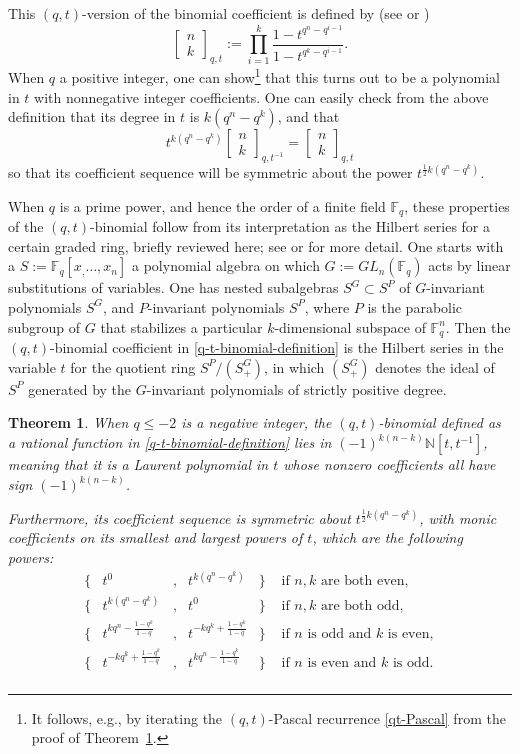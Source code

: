 \documentclass[10pt]{amsart}
\theoremstyle{plain}
\newtheorem{theorem}{Theorem}
\theoremstyle{definition}
\theoremstyle{remark}
\numberwithin{equation}{section}
\newcommand\qbin[3]{\left[\begin{matrix} #1 \\ #2 \end{matrix} \right]_{#3}}
\newcommand\FF{\mathbb{F}}
\newcommand\NN{\mathbb{N}}
\begin{document}
This $(q,t)$-version of the binomial coefficient
is defined by (see  \cite{RS} or \cite[p. 43]{RSW})
\begin{equation}
\label{q-t-binomial-definition}
\qbin{n}{k}{q,t}:=\prod_{i=1}^k \frac{1-t^{q^n-q^{i-1}}}
{1-t^{q^k-q^{i-1}}}.
\end{equation}
When $q$ a positive integer, one can show\footnote{It follows, 
e.g., by iterating the $(q,t)$-Pascal recurrence 
\eqref{qt-Pascal} from the proof of Theorem~\ref{lastthm}.}
that this turns out to be a polynomial in $t$ with 
nonnegative integer coefficients.
One can easily check from the above definition that 
its degree in $t$ is $k(q^n-q^k)$, and that
\begin{equation}
\label{coefficient-symmetry}
t^{k(q^n-q^k)} \qbin{n}{k}{q,t^{-1}}
=
 \qbin{n}{k}{q,t}
\end{equation}
so that its coefficient sequence will be symmetric about the power
$t^{\frac{1}{2} k(q^n-q^k)}$.

When $q$ is a prime power, and hence the order of a finite
field $\FF_q$, these properties of the
$(q,t)$-binomial follow from its interpretation
as the Hilbert series for a certain graded ring, 
briefly reviewed here; see \cite[\S 9]{RSW} or \cite{RS}
for more detail. One starts with a 
$S:=\FF_q[x_,\ldots,x_n]$ a polynomial algebra
on which $G:=GL_n(\FF_q)$ acts by linear substitutions of variables.
One has nested subalgebras $S^G \subset S^P$ of 
$G$-invariant polynomials $S^G$, and $P$-invariant polynomials $S^P$, where
$P$ is the parabolic subgroup of $G$ that stabilizes a particular $k$-dimensional
subspace of $\FF_q^n$.  Then the $(q,t)$-binomial coefficient in \eqref{q-t-binomial-definition}
is the Hilbert series in the variable $t$ for the quotient ring $S^P/(S^G_+)$, in which
$(S^G_+)$ denotes the ideal of  $S^P$ generated by the $G$-invariant polynomials
of strictly positive degree.

\begin{theorem}
\label{lastthm}
When $q\le -2$ is a negative integer, the $(q,t)$-binomial
defined as a rational function in \eqref{q-t-binomial-definition}
lies in $(-1)^{k(n-k)} \NN[t,t^{-1}]$, meaning that
it is a Laurent polynomial in $t$ whose nonzero
coefficients all have sign $(-1)^{k(n-k)}$.

Furthermore, its coefficient sequence is
symmetric about $t^{\frac{1}{2} k(q^n-q^k)}$,
with monic coefficients on its smallest and largest
powers of $t$, which are the following powers:
$$
\begin{array}{rcccll}
\{& t^0 &,& t^{k(q^n-q^k)} &\} & \text{ if }n,k\text{ are both even}, \\
\{& t^{k(q^n-q^k)} &,& t^0 &\} & \text{ if }n,k\text{ are both odd}, \\
\{& t^{kq^n-\frac{1-q^k}{1-q}} &,& t^{-kq^k+\frac{1-q^k}{1-q}} &\} 
   & \text{ if }n\text{ is odd and }k\text{ is even}, \\
\{& t^{-kq^k+\frac{1-q^k}{1-q}} &,& t^{kq^n-\frac{1-q^k}{1-q}} &\}
   & \text{ if }n\text{ is even and }k\text{ is odd}. \\
\end{array}
$$
\end{theorem}
\end{document}
